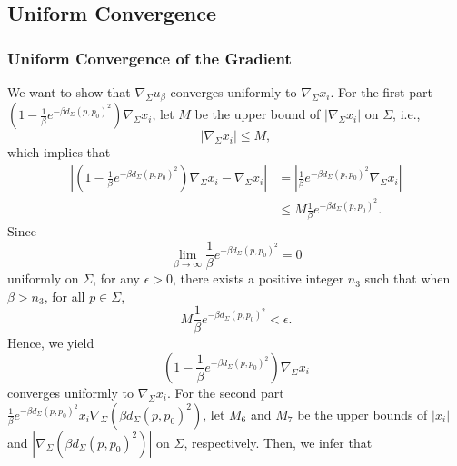 \documentclass[a4, 12pt]{amsart}
\numberwithin{equation}{section} \numberwithin{equation}{section}
\begin{document}
\subsection{Uniform Convergence}
\subsubsection{Uniform Convergence of the Gradient}

We want to show that $\nabla_{\Sigma} u_{\beta}$ converges uniformly to $\nabla_{\Sigma} x_{i}$.
For the first part $\left(1-\frac{1}{\beta} e^{-\beta d_{\Sigma}\left(p, p_{0}\right)^{2}}\right) \nabla_{\Sigma} x_{i}$, let $M$ be the upper bound of $\left|\nabla_{\Sigma} x_{i}\right|$ on $\Sigma$, i.e.,
\begin{equation*}\left|\nabla_{\Sigma} x_{i}\right| \leq M,\end{equation*}
which implies that
\begin{equation*}\begin{aligned}\left|\left(1-\frac{1}{\beta} e^{-\beta d_{\Sigma}\left(p, p_{0}\right)^{2}}\right) \nabla_{\Sigma} x_{i}-\nabla_{\Sigma} x_{i}\right|&=\left|\frac{1}{\beta} e^{-\beta d_{\Sigma}\left(p, p_{0}\right)^{2}} \nabla_{\Sigma} x_{i}\right|\\& \leq M \frac{1}{\beta} e^{-\beta d_{\Sigma}\left(p, p_{0}\right)^{2}}.\end{aligned}\end{equation*}
Since
\begin{equation*}\lim _{\beta \rightarrow \infty} \frac{1}{\beta} e^{-\beta d_{\Sigma}\left(p, p_{0}\right)^{2}}=0\end{equation*} uniformly on $\Sigma$, for any $\epsilon>0$, there exists a positive integer $n_{3}$ such that when $\beta>n_{3}$, for all $p \in \Sigma$,
\begin{equation*}M \frac{1}{\beta} e^{-\beta d_{\Sigma}\left(p, p_{0}\right)^{2}}<\epsilon.\end{equation*}Hence, we yield
\begin{equation*}\left(1-\frac{1}{\beta} e^{-\beta d_{\Sigma}\left(p, p_{0}\right)^{2}}\right) \nabla_{\Sigma} x_{i}\end{equation*} converges uniformly to $\nabla_{\Sigma} x_{i}$.
For the second part $\frac{1}{\beta} e^{-\beta d_{\Sigma}\left(p, p_{0}\right)^{2}} x_{i} \nabla_{\Sigma}\left(\beta d_{\Sigma}\left(p, p_{0}\right)^{2}\right)$, let $M_{6}$ and $M_{7}$ be the upper bounds of $\left|x_{i}\right|$ and $\left|\nabla_{\Sigma}\left(\beta d_{\Sigma}\left(p, p_{0}\right)^{2}\right)\right|$ on $\Sigma$, respectively. Then, we infer that
\end{document}
